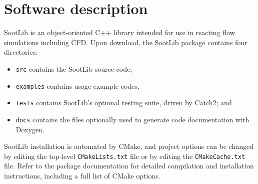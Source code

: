 \documentclass[preprint,letterpaper]{elsarticle}
\begin{document}

\section{Software description}
\label{s:architecture}

SootLib is an object-oriented C++ library intended for use in reacting flow simulations including CFD.
Upon download, the SootLib package contains four directories: 
%
\begin{itemize}
    \item \texttt{src} contains the SootLib source code; 
    \item \texttt{examples} contains usage example codes; 
    \item \texttt{tests} contains SootLib's optional testing suite, driven by Catch2; and 
    \item \texttt{docs} contains the files optionally used to generate code documentation with Doxygen.
\end{itemize}
%
SootLib installation is automated by CMake, and project options can be changed by editing the top-level \texttt{CMakeLists.txt} file or by editing the \texttt{CMakeCache.txt} file. Refer to the package documentation for detailed compilation and installation instructions, including a full list of CMake options.
\end{document}
